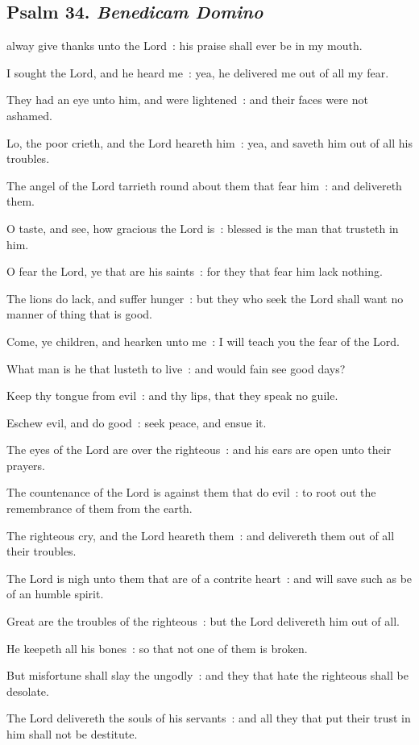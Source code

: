 \subsection{Psalm 34. \textit{Benedicam Domino}}

 alway give thanks unto the Lord~: his praise shall ever be in my mouth.\par
{}
I sought the Lord, and he heard me~: yea, he delivered me out of all my fear.\par
{}They had an eye unto him, and were lightened~: and their faces were not ashamed.\par
{}Lo, the poor crieth, and the Lord heareth him~: yea, and saveth him out of all his troubles.\par
{}The angel of the Lord tarrieth round about them that fear him~: and delivereth them.\par
{}O taste, and see, how gracious the Lord is~: blessed is the man that trusteth in him.\par
{}O fear the Lord, ye that are his saints~: for they that fear him lack nothing.\par
{}The lions do lack, and suffer hunger~: but they who seek the Lord shall want no manner of thing that is good.\par
{}Come, ye children, and hearken unto me~: I will teach you the fear of the Lord.\par
{}What man is he that lusteth to live~: and would fain see good days?\par
{}Keep thy tongue from evil~: and thy lips, that they speak no guile.\par
{}Eschew evil, and do good~: seek peace, and ensue it.\par
{}The eyes of the Lord are over the righteous~: and his ears are open unto their prayers.\par
{}The countenance of the Lord is against them that do evil~: to root out the remembrance of them from the earth.\par
{}The righteous cry, and the Lord heareth them~: and delivereth them out of all their troubles.\par
{}The Lord is nigh unto them that are of a contrite heart~: and will save such as be of an humble spirit.\par
{}Great are the troubles of the righteous~: but the Lord delivereth him out of all.\par
{}He keepeth all his bones~: so that not one of them is broken.\par
{}But misfortune shall slay the ungodly~: and they that hate the righteous shall be desolate.\par
{}The Lord delivereth the souls of his servants~: and all they that put their trust in him shall not be destitute.\par


